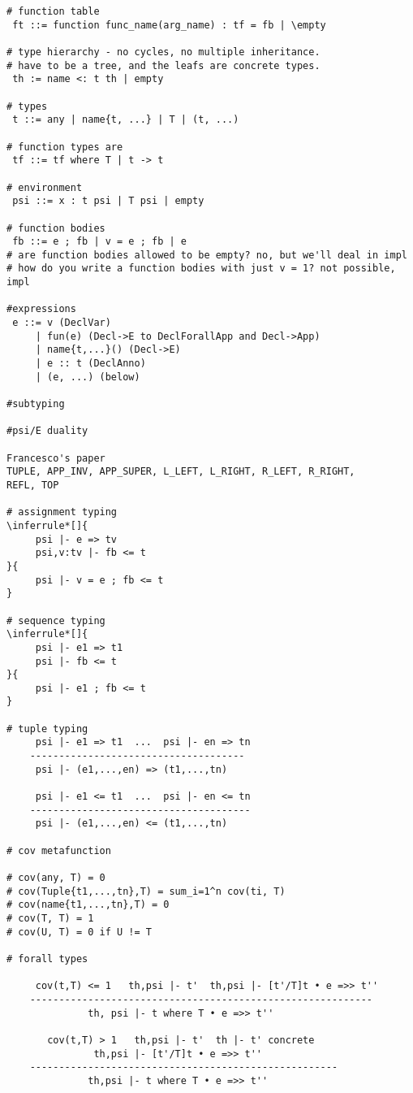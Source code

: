 \documentclass{report} %
\begin{document}
\begin{verbatim}
# function table
 ft ::= function func_name(arg_name) : tf = fb | \empty

# type hierarchy - no cycles, no multiple inheritance. 
# have to be a tree, and the leafs are concrete types.
 th := name <: t th | empty

# types
 t ::= any | name{t, ...} | T | (t, ...)

# function types are
 tf ::= tf where T | t -> t

# environment
 psi ::= x : t psi | T psi | empty

# function bodies
 fb ::= e ; fb | v = e ; fb | e 
# are function bodies allowed to be empty? no, but we'll deal in impl
# how do you write a function bodies with just v = 1? not possible, impl

#expressions
 e ::= v (DeclVar)
     | fun(e) (Decl->E to DeclForallApp and Decl->App)
     | name{t,...}() (Decl->E)
     | e :: t (DeclAnno)
     | (e, ...) (below)

#subtyping

#psi/E duality

Francesco's paper
TUPLE, APP_INV, APP_SUPER, L_LEFT, L_RIGHT, R_LEFT, R_RIGHT, 
REFL, TOP

# assignment typing
\inferrule*[]{
     psi |- e => tv
     psi,v:tv |- fb <= t
}{
     psi |- v = e ; fb <= t
}

# sequence typing
\inferrule*[]{
     psi |- e1 => t1
     psi |- fb <= t
}{
     psi |- e1 ; fb <= t
}

# tuple typing
     psi |- e1 => t1  ...  psi |- en => tn
    -------------------------------------
     psi |- (e1,...,en) => (t1,...,tn)

     psi |- e1 <= t1  ...  psi |- en <= tn
    --------------------------------------
     psi |- (e1,...,en) <= (t1,...,tn)

# cov metafunction

# cov(any, T) = 0
# cov(Tuple{t1,...,tn},T) = sum_i=1^n cov(ti, T)
# cov(name{t1,...,tn},T) = 0
# cov(T, T) = 1
# cov(U, T) = 0 if U != T

# forall types

     cov(t,T) <= 1   th,psi |- t'  th,psi |- [t'/T]t • e =>> t''
    -----------------------------------------------------------
              th, psi |- t where T • e =>> t''

       cov(t,T) > 1   th,psi |- t'  th |- t' concrete  
               th,psi |- [t'/T]t • e =>> t''
    -----------------------------------------------------
              th,psi |- t where T • e =>> t''


\end{verbatim}
\end{document}
